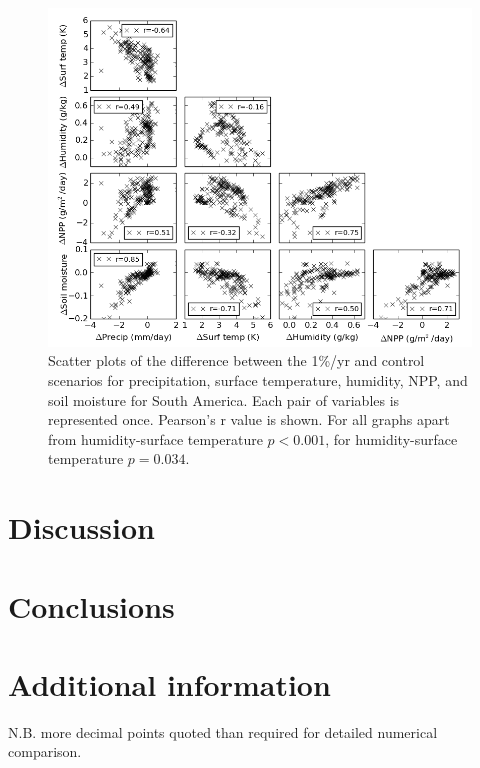 \documentclass{article}
\begin{document}
\begin{figure}[hbp]
    \centering
    \includegraphics[width=\textwidth]{figures/corr}
    \caption{Scatter plots of the difference between the 1\%/yr and control scenarios for precipitation, surface temperature, humidity, NPP, and soil moisture for South America. Each pair of variables is represented once. Pearson's r value is shown. For all graphs apart from humidity-surface temperature $p < 0.001$, for humidity-surface temperature $p = 0.034$. }
    \label{fig:corr}
\end{figure}

\newpage
\section{Discussion}

\section{Conclusions}

\printbibliography
\appendix 

\section{Additional information}

N.B. more decimal points quoted than required for detailed numerical comparison.
\end{document}
